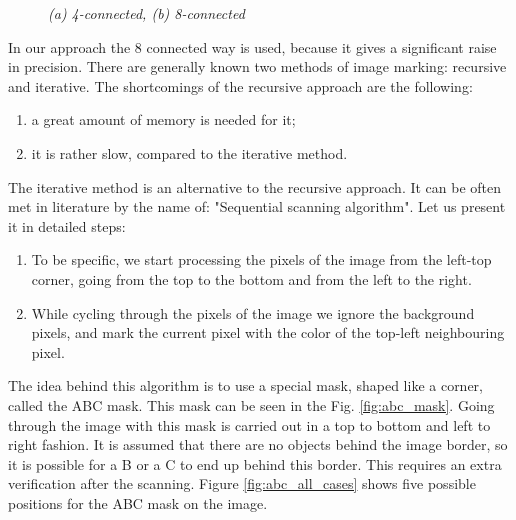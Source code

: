 \documentclass[12pt,a4paper,oneside,titlepage]{article}
\begin{document}
\begin{figure}[h]
\begin{minipage}[h]{0.49\linewidth}
\end{minipage}
\hfill
\begin{minipage}[h]{0.49\linewidth}
\end{minipage}
\caption{\textit{(a) 4-connected, (b) 8-connected}}
\label{ris:connections}
\end{figure}



In our approach the 8 connected way is used, because it gives a significant raise in precision.
There are generally known two methods of image marking: recursive and iterative.
The shortcomings of the recursive approach are the following:
\begin{enumerate}
  \item a great amount of memory is needed for it;
  \item it is rather slow, compared to the iterative method.
\end{enumerate}
The iterative method is an alternative to the recursive approach. It can be often met in literature by the name of: "Sequential scanning algorithm".
Let us present it in detailed steps:
\begin{enumerate}
  \item To be specific, we start processing the pixels of the image from the left-top corner, going from the top to the bottom and from the left to the right.
  \item While cycling through the pixels of the image we ignore the background pixels, and mark the current pixel with the color of the top-left neighbouring pixel.
\end{enumerate}

The idea behind this algorithm is to use a special mask, shaped like a corner, called the ABC mask. 
This mask can be seen in the Fig. \ref{fig:abc_mask}.
Going through the image with this mask is carried out in a top to bottom and left to right fashion.
It is assumed that there are no objects behind the image border, so it is possible for a B or a C to end up behind this border.
This requires an extra verification after the scanning.
Figure \ref{fig:abc_all_cases} shows five possible positions for the ABC mask on the image.
\end{document}
